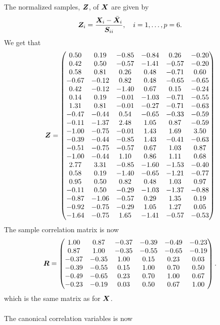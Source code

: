 The normalized samples, $\bm{Z}$, of $\bm{X}$ are given by
\begin{equation*}
  \bm{Z}_i = \frac{\bm{X}_i - \bar {\bm{X}}_i}{\bm{S}_{ii}}, \quad i = 1, \dots, p = 6.
\end{equation*}
We get that
\begin{equation*}
  \bm{Z} =
  \begin{pmatrix}
    0.50 &0.19 &-0.85 &-0.84 &0.26 &-0.20 \\ 
    0.42 &0.50 &-0.57 &-1.41 &-0.57 &-0.20 \\ 
    0.58 &0.81 &0.26 &0.48 &-0.71 &0.60 \\ 
    -0.67 &-0.12 &0.82 &0.48 &-0.65 &-0.65 \\ 
    0.42 &-0.12 &-1.40 &0.67 &0.15 &-0.24 \\ 
    0.14 &0.19 &-0.01 &-1.03 &-0.71 &-0.55 \\ 
    1.31 &0.81 &-0.01 &-0.27 &-0.71 &-0.63 \\ 
    -0.47 &-0.44 &0.54 &-0.65 &-0.33 &-0.59 \\ 
    -0.11 &-1.37 &2.48 &1.05 &0.87 &-0.59 \\ 
    -1.00 &-0.75 &-0.01 &1.43 &1.69 &3.50 \\ 
    -0.39 &-0.44 &-0.85 &1.43 &-0.41 &-0.63 \\ 
    -0.51 &-0.75 &-0.57 &0.67 &1.03 &0.87 \\ 
    -1.00 &-0.44 &1.10 &0.86 &1.11 &0.68 \\ 
    2.77 &3.31 &-0.85 &-1.60 &-1.53 &-0.40 \\ 
    0.58 &0.19 &-1.40 &-0.65 &-1.21 &-0.77 \\ 
    0.95 &0.50 &0.82 &0.48 &1.03 &0.97 \\ 
    -0.11 &0.50 &-0.29 &-1.03 &-1.37 &-0.88 \\ 
    -0.87 &-1.06 &-0.57 &0.29 &1.35 &0.19 \\ 
    -0.92 &-0.75 &-0.29 &1.05 &1.27 &0.05 \\ 
    -1.64 &-0.75 &1.65 &-1.41 &-0.57 &-0.53  
  \end{pmatrix}
\end{equation*}
The sample correlation matrix is now
\begin{equation*}
  \bm{R} =
  \begin{pmatrix}
    1.00 &0.87 &-0.37 &-0.39 &-0.49 &-0.23 \\ 
    0.87 &1.00 &-0.35 &-0.55 &-0.65 &-0.19 \\ 
    -0.37 &-0.35 &1.00 &0.15 &0.23 &0.03 \\ 
    -0.39 &-0.55 &0.15 &1.00 &0.70 &0.50 \\ 
    -0.49 &-0.65 &0.23 &0.70 &1.00 &0.67 \\ 
    -0.23 &-0.19 &0.03 &0.50 &0.67 &1.00
  \end{pmatrix}.
\end{equation*}
which is the same matrix as for $\bm{X}$.\\
\\
The canonical correlation variables is now

